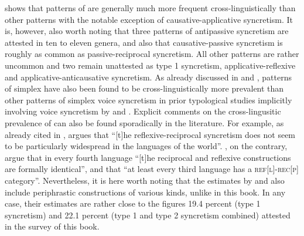  shows that patterns of  are generally much more frequent cross-linguistically than other patterns with the notable exception of causative-applicative syncretism. It is, however, also worth noting that three patterns of antipassive syncretism are attested in ten to eleven genera, and also that causative-passive syncretism is roughly as common as passive-reciprocal syncretism. All other patterns are rather uncommon and two remain unattested as type 1 syncretism, applicative-reflexive and applicative-anticausative syncretism. As already discussed in  and , patterns of simplex  have also been found to be cross-linguistically more prevalent than other patterns of simplex voice syncretism in prior typological studies implicitly involving voice syncretism by \cite{geniusiene:1987} and \cite{haspelmath:1990}. Explicit comments on the cross-lingusitic prevalence of  can also be found sporadically in the literature. For example, as already cited in , \cite[66]{creissels:2016} argues that “[t]he reflexive-reciprocal syncretism does not seem to be particularly widespread in the languages of the world”. \cite[430]{maslova:nedjalkov:2005}, on the contrary, argue that in every fourth language “[t]he reciprocal and reflexive constructions are formally identical”, and \cite[171]{heine:miyashita:2008} that “at least every third language has a \textsc{ref[l]-rec[p]} category”. Nevertheless, it is here worth noting that the estimates by \citeauthor{maslova:nedjalkov:2005} and \citeauthor{heine:miyashita:2008} also include periphrastic constructions of various kinds, unlike in this book. In any case, their estimates are rather close to the figures 19.4 percent (type 1 syncretism) and 22.1 percent (type 1 and type 2 syncretism combined) attested in the survey of this book.

